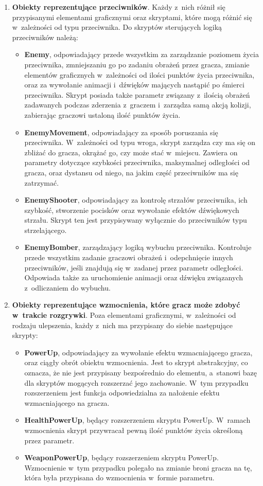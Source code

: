 \begin{enumerate}
	\item \textbf{Obiekty reprezentujące przeciwników}. Każdy z~nich różnił się przypisanymi elementami graficznymi oraz skryptami, które mogą różnić się w~zależności od typu przeciwnika. Do skryptów sterujących logiką przeciwników należą:
	\begin{itemize}
		\item \textbf{Enemy}, odpowiadający przede wszystkim za zarządzanie poziomem życia przeciwnika, zmniejszaniu go po zadaniu obrażeń przez gracza, zmianie elementów graficznych w~zależności od ilości punktów życia przeciwnika, oraz za wywołanie animacji i~dźwięków mających nastąpić po śmierci przeciwnika. Skrypt posiada także parametr związany z~ilością obrażeń zadawanych podczas zderzenia z~graczem i~zarządza samą akcją kolizji, zabierając graczowi ustaloną ilość punktów życia.
		\item \textbf{EnemyMovement}, odpowiadający za sposób poruszania się przeciwnika. W~zależności od typu wroga, skrypt zarządza czy ma się on zbliżać do gracza, okrążać go, czy może stać w~miejscu. Zawiera on parametry dotyczące szybkości przeciwnika, maksymalnej odległości od gracza, oraz dystansu od niego, na jakim część przeciwników ma się zatrzymać.
		\item \textbf{EnemyShooter}, odpowiadający za kontrolę strzałów przeciwnika, ich szybkość, stworzenie pocisków oraz wywołanie efektów dźwiękowych strzału. Skrypt ten jest przypisywany wyłącznie do przeciwników typu strzelającego.
		\item \textbf{EnemyBomber}, zarządzający logiką wybuchu przeciwnika. Kontroluje przede wszystkim zadanie graczowi obrażeń i~odepchnięcie innych przeciwników, jeśli znajdują się w~zadanej przez parametr odległości. Odpowiada także za uruchomienie animacji oraz dźwięku związanych z~odliczaniem do wybuchu.
	\end{itemize}
	
	\item \textbf{Obiekty reprezentujące wzmocnienia, które gracz może zdobyć w~trakcie rozgrywki}. Poza elementami graficznymi, w~zależności od rodzaju ulepszenia, każdy z~nich ma przypisany do siebie następujące skrypty:
	\begin{itemize}
		\item \textbf{PowerUp}, odpowiadający za wywołanie efektu wzmacniającego gracza, oraz ciągły obrót obiektu wzmocnienia. Jest to skrypt abstrakcyjny, co oznacza, że nie jest przypisany bezpośrednio do elementu, a~stanowi bazę dla skryptów mogących rozszerzać jego zachowanie. W~tym przypadku rozszerzeniem jest funkcja odpowiedzialna za nałożenie efektu wzmacniającego na gracza.
		\item \textbf{HealthPowerUp}, będący rozszerzeniem skryptu PowerUp. W~ramach wzmocnienia skrypt przywracał pewną ilość punktów życia określoną przez parametr.
		\item \textbf{WeaponPowerUp}, będący rozszerzeniem skryptu PowerUp. Wzmocnienie w~tym przypadku polegało na zmianie broni gracza na tę, która była przypisana do wzmocnienia w~formie parametru.
	\end{itemize}
\end{enumerate}

